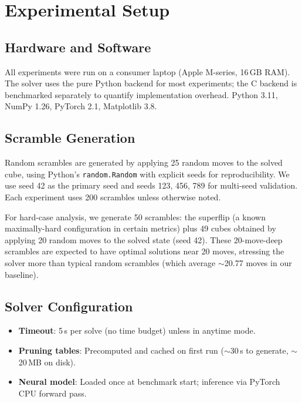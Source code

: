 \documentclass[conference]{IEEEtran}
\begin{document}
\section{Experimental Setup}
\label{sec:setup}

\subsection{Hardware and Software}
All experiments were run on a consumer laptop (Apple M-series, 16\,GB RAM). The solver uses the pure Python backend for most experiments; the C backend is benchmarked separately to quantify implementation overhead. Python 3.11, NumPy 1.26, PyTorch 2.1, Matplotlib 3.8.

\subsection{Scramble Generation}
Random scrambles are generated by applying 25 random moves to the solved cube, using Python's \texttt{random.Random} with explicit seeds for reproducibility. We use seed 42 as the primary seed and seeds 123, 456, 789 for multi-seed validation. Each experiment uses 200 scrambles unless otherwise noted.

For hard-case analysis, we generate 50 scrambles: the superflip (a known maximally-hard configuration in certain metrics) plus 49 cubes obtained by applying 20 random moves to the solved state (seed 42). These 20-move-deep scrambles are expected to have optimal solutions near 20 moves, stressing the solver more than typical random scrambles (which average $\sim$20.77 moves in our baseline).

\subsection{Solver Configuration}
\begin{itemize}[leftmargin=*]
  \item \textbf{Timeout}: 5\,s per solve (no time budget) unless in anytime mode.
  \item \textbf{Pruning tables}: Precomputed and cached on first run ($\sim$30\,s to generate, $\sim$20\,MB on disk).
  \item \textbf{Neural model}: Loaded once at benchmark start; inference via PyTorch CPU forward pass.
\end{itemize}
\end{document}
